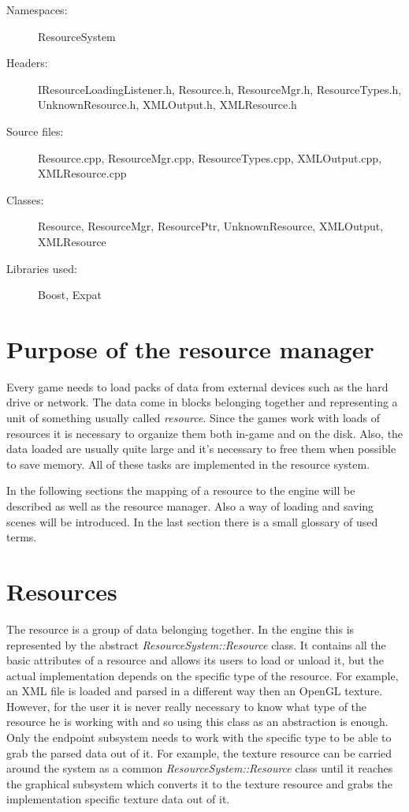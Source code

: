 \begin{description}
  \item[Namespaces:] ResourceSystem
  \item[Headers:] IResourceLoadingListener.h, Resource.h, ResourceMgr.h, Re\-sour\-ce\-Ty\-pes.h, UnknownResource.h, XMLOutput.h, XMLResource.h
  \item[Source files:] Resource.cpp, ResourceMgr.cpp, ResourceTypes.cpp, XML\-Out\-put.cpp, XMLResource.cpp
  \item[Classes:] Resource, ResourceMgr, ResourcePtr, UnknownResource, XML\-Out\-put, XMLResource
  \item[Libraries used:] Boost, Expat
\end{description}

\section{Purpose of the resource manager}

Every game needs to load packs of data from external devices such as the hard drive or network. The data come in blocks belonging together and representing a unit of something usually called \emph{resource}. Since the games work with loads of resources it is necessary to organize them both in-game and on the disk. Also, the data loaded are usually quite large and it's necessary to free them when possible to save memory. All of these tasks are implemented in the resource system.

In the following sections the mapping of a resource to the engine will be described as well as the resource manager. Also a way of loading and saving scenes will be introduced. In the last section there is a small glossary of used terms.

\section{Resources}

The resource is a group of data belonging together. In the engine this is represented by the abstract \emph{ResourceSystem::Resource} class. It contains all the basic attributes of a resource and allows its users to load or unload it, but the actual implementation depends on the specific type of the resource. For example, an XML file is loaded and parsed in a different way then an OpenGL texture. However, for the user it is never really necessary to know what type of the resource he is working with and so using this class as an abstraction is enough. Only the endpoint subsystem needs to work with the specific type to be able to grab the parsed data out of it. For example, the texture resource can be carried around the system as a common \emph{ResourceSystem::Resource} class until it reaches the graphical subsystem which converts it to the texture resource and grabs the implementation specific texture data out of it.


